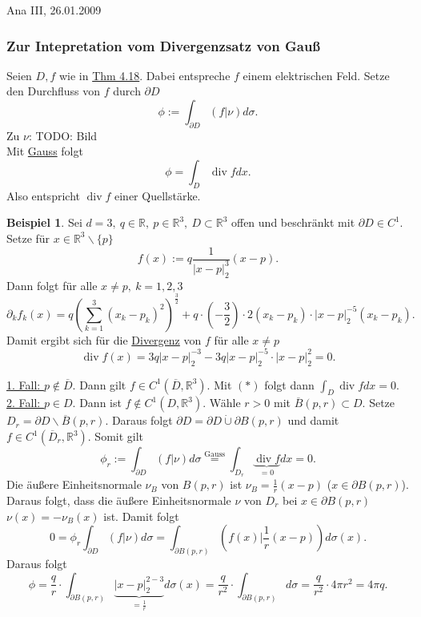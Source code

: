 \documentclass[a4paper]{scrreprt}
\newcommand{\R}{\mathbb{R}}
\newcommand{\dcup}{\dot{\cup}}
\newcommand{\jlabel}[1]{\label{j_#1}}
\newcommand{\jshortlink}[1]{\jhyperref{#1}{\text{#1}}}
\newcommand{\jhyperref}[2]{\hyperref[j_#1]{#2}}
\newcommand{\jlink}[1]{\jhyperref{#1}{#1}}
\newcommand{\jspacesmall}{\vspace{4pt}}
\newcommand{\jdate}[1]{\jspacesmall\begin{center}\jlabel{#1}\tiny{Ana III, #1}\end{center}}
\renewcommand{\div}{\mathop{\mathrm{{div}}}}
\theoremstyle{plain}
\theoremstyle{definition}
\newtheorem{expl}[thm]{Beispiel}
\begin{document}
{{{{\jdate{26.01.2009}

\subsubsection{Zur Intepretation vom Divergenzsatz von Gauß}
Seien $D,f$ wie in \jlink{Thm 4.18}. Dabei entspreche $f$ einem elektrischen Feld. Setze den Durchfluss von $f$ durch $\partial D$
\[
    \phi := \int_{\partial D} (f|\nu) d\sigma.
\]
Zu $\nu$: TODO: Bild\\
Mit \jlink{Gauss} folgt
\[
    \tag{$*$}
    \phi = \int_D \div f dx.
\]
Also entspricht $\div f$ einer Quellstärke.

\begin{expl}
    \jlabel{Bsp 4.20}
    Sei $d=3,\ q\in \R,\ p \in \R^3,\ D\subset \R^3$ offen und beschränkt mit $\partial D\in C^1$. Setze für $x\in\R^3\backslash \{p\}$
    \[
        f(x) := q\frac{1}{|x-p|_2^3}(x-p).
    \]
    Dann folgt für alle $x \ne p, \ k=1,2,3$
    \[
        \partial_k f_k(x) = q\left(\sum_{k=1}^3 (x_k - p_k)^2 \right)^\frac{3}{2} + q\cdot \left(-\frac{3}{2} \right)\cdot 2(x_k-p_k)\cdot |x-p|_2^{-5}(x_k-p_k).
    \]
    Damit ergibt sich für die \jlink{Divergenz} von $f$ für alle $x\ne p$
    \[
        \div f(x) = 3q|x-p|_2^{-3} - 3q|x-p|_2^{-5}\cdot |x-p|_2^{2} = 0.
    \]

    \uline{1. Fall: $p\notin \overline{D}$}. Dann gilt $f\in C^1(\overline{D}, \R^3)$. Mit $(*)$ folgt dann $\int_D\div f dx = 0$.\\
    \uline{2. Fall: $p \in D$}. Dann ist $f\notin C^1(D,\R^3)$. Wähle $r>0$ mit $\overline{B}(p,r)\subset D$. Setze $D_r = \partial D\backslash \overline{B}(p,r)$. Daraus folgt $\partial D = \partial D \dcup \partial B(p,r)$ und damit $f\in C^1(\overline{D}_r, \R^3)$. Somit gilt
    \[
        \phi_r := \int_{\partial D} (f|\nu)d\sigma \overset{\jshortlink{Gauss}}{=} \int_{D_r} \underbrace{\div f}_{=0}dx = 0.
    \]
    Die äußere Einheitsnormale $\nu_B$ von $B(p,r)$ ist $\nu_B = \frac{1}{r}(x-p)$ ($x\in \partial B(p,r)$).
    Daraus folgt, dass die äußere Einheitsnormale $\nu$ von $D_r$ bei $x \in \partial B(p,r)$ $\nu(x) = -\nu_B(x)$ ist. Damit folgt
    \[
        0 = \phi_r \int_{\partial D} (f|\nu)d\sigma = \int_{\partial B(p,r)} \left(f(x)|\frac{1}{r} (x-p) \right)d\sigma(x).
    \]
    Daraus folgt
    \[
        \phi = \frac{q}{r} \cdot \int_{\partial B(p,r)} \underbrace{|x-p|_2^{2-3}}_{= \frac{1}{r}} d\sigma(x) = \frac{q}{r^2} \cdot \int_{\partial B(p,r)} d\sigma = \frac{q}{r^2} \cdot 4\pi r^2 = 4\pi q.
    \]
\end{expl}


}}}}
\end{document}
